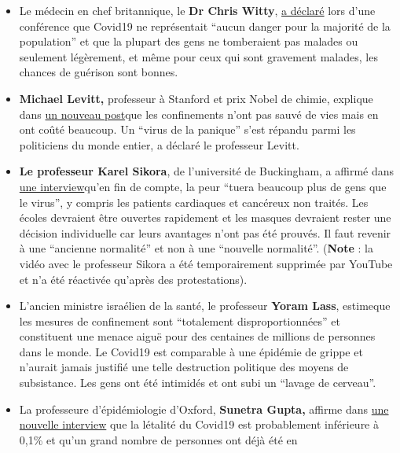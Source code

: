\begin{itemize}
\tightlist
\item
  Le médecin en chef britannique, le \textbf{Dr Chris Witty},
  \href{https://off-guardian.org/2020/05/15/watch-uk-chief-medic-confirms-again-covid19-harmless-to-vast-majority/}{a
  déclaré} lors d'une conférence que Covid19 ne représentait ``aucun
  danger pour la majorité de la population'' et que la plupart des gens
  ne tomberaient pas malades ou seulement légèrement, et même pour ceux
  qui sont gravement malades, les chances de guérison sont bonnes.
\item
  \textbf{Michael Levitt,} professeur à Stanford et prix Nobel de
  chimie, explique dans
  \href{https://www.telegraph.co.uk/news/2020/05/23/lockdown-saved-no-lives-may-have-cost-nobel-prize-winner-believes/}{un
  nouveau post}que les confinements n'ont pas sauvé de vies mais en ont
  coûté beaucoup. Un ``virus de la panique'' s'est répandu parmi les
  politiciens du monde entier, a déclaré le professeur Levitt.
\item
  \textbf{Le professeur Karel Sikora}, de l'université de Buckingham, a
  affirmé dans \href{https://www.youtube.com/watch?v=uk2YZfnsOPg}{une
  interview}qu'en fin de compte, la peur ``tuera beaucoup plus de gens
  que le virus'', y compris les patients cardiaques et cancéreux non
  traités. Les écoles devraient être ouvertes rapidement et les masques
  devraient rester une décision individuelle car leurs avantages n'ont
  pas été prouvés. Il faut revenir à une ``ancienne normalité'' et non à
  une ``nouvelle normalité''. (\textbf{Note} : la vidéo avec le
  professeur Sikora a été temporairement supprimée par YouTube et n'a
  été réactivée qu'après des protestations).
\item
  L'ancien ministre israélien de la santé, le professeur \textbf{Yoram
  Lass}, estimeque les mesures de confinement sont ``totalement
  disproportionnées'' et constituent une menace aiguë pour des centaines
  de millions de personnes dans le monde. Le Covid19 est comparable à
  une épidémie de grippe et n'aurait jamais justifié une telle
  destruction politique des moyens de subsistance. Les gens ont été
  intimidés et ont subi un ``lavage de cerveau''.
\item
  La professeure d'épidémiologie d'Oxford, \textbf{Sunetra Gupta,}
  affirme dans
  \href{https://unherd.com/2020/05/oxford-doubles-down-sunetra-gupta-interview/}{une
  nouvelle interview} que la létalité du Covid19 est probablement
  inférieure à 0,1\% et qu'un grand nombre de personnes ont déjà été en

\end{itemize}
